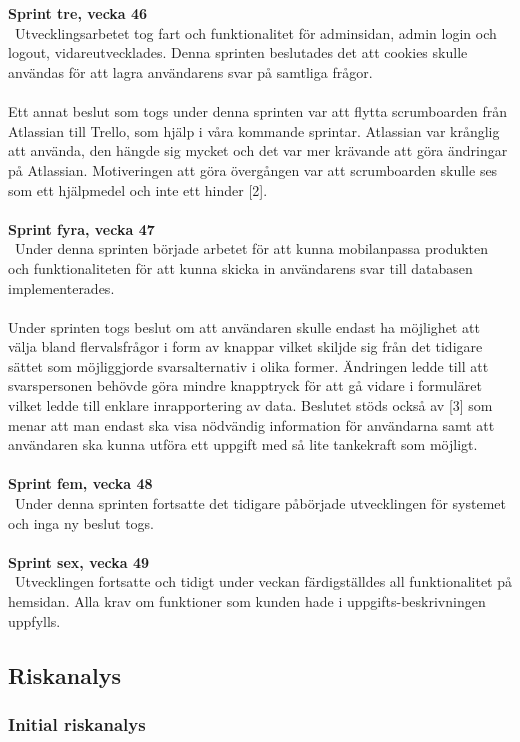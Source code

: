 \documentclass[12pt]{article}
\begin{document}
\\\\
\textbf{Sprint tre, vecka 46} \\\
Utvecklingsarbetet tog fart och funktionalitet för adminsidan, admin login och logout, vidareutvecklades. Denna sprinten beslutades det att cookies skulle användas för att lagra användarens svar på samtliga frågor.\\\\
Ett annat beslut som togs under denna sprinten var att flytta scrumboarden från Atlassian till Trello, som hjälp i våra kommande sprintar. Atlassian var krånglig att använda, den hängde sig mycket och det var mer krävande att göra ändringar på Atlassian. Motiveringen att göra övergången var att scrumboarden skulle ses som ett hjälpmedel och inte ett hinder [2].\\\\
\textbf{Sprint fyra, vecka 47} \\\
Under denna sprinten började arbetet för att kunna mobilanpassa produkten och funktionaliteten för att kunna skicka in användarens svar till databasen implementerades.\\\\
Under sprinten togs beslut om att användaren skulle endast ha möjlighet att välja bland flervalsfrågor i form av knappar vilket skiljde sig från det tidigare sättet som möjliggjorde svarsalternativ i olika former. Ändringen ledde till att svarspersonen behövde göra mindre knapptryck för att gå vidare i formuläret vilket ledde till enklare inrapportering av data. Beslutet stöds också av [3] som menar att man endast ska visa nödvändig information för användarna samt att användaren ska kunna utföra ett uppgift med så lite tankekraft som möjligt.\\\\
\textbf{Sprint fem, vecka 48} \\\
Under denna sprinten fortsatte det tidigare påbörjade utvecklingen för systemet och inga ny beslut togs. \\\\
\textbf{Sprint sex, vecka 49} \\\
Utvecklingen fortsatte och tidigt under veckan färdigställdes all funktionalitet på hemsidan. Alla krav om funktioner som kunden hade i uppgifts-beskrivningen uppfylls.
\subsection{Riskanalys}
\subsubsection{Initial riskanalys}
\end{document}

